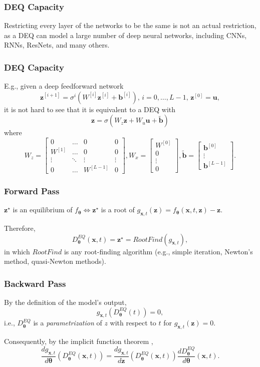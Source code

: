 \documentclass[t]{beamer}
\begin{document}
\begin{frame}
    \frametitle{DEQ Capacity}
    \vfill
    Restricting every layer of the networks to be the same is not an actual restriction, as a DEQ can model a large number of deep neural networks, including CNNs, RNNs, ResNets, and many others.
    \vfill
\end{frame}

\begin{frame}
    \frametitle{DEQ Capacity}

    E.g., given a deep feedforward network \[
	\bm{z}^{[i+1]} = \sigma^{i}\left( W^{[i]}\bm{z}^{[i]} + \bm{b}^{[i]} \right),\,i=0,\ldots,L-1,\,\bm{z}^{[0]} = \bm{u}
    ,\]
    it is not hard to see that it is equivalent to a DEQ with \[
	\bm{z} = \sigma\left( W_z\bm{z} + W_u\bm{u} + \bm{\tilde{b}} \right) 
    \] where \[
    W_z=\begin{bmatrix} 
	0 & \hdots & 0 & 0 \\
	W^{[1]} & \hdots & 0 & 0 \\
	\vdots & \ddots & \vdots & \vdots \\
	0 & \hdots & W^{[L-1]} & 0
    \end{bmatrix},
    W_x = \begin{bmatrix} W^{[0]} \\ 0 \\ \vdots \\ 0 \end{bmatrix} ,
    \bm{\tilde{b}} = \begin{bmatrix} \bm{b}^{[0]} \\ \vdots \\ \bm{b}^{[L-1]} \end{bmatrix}
    .\] 
\end{frame}

\begin{frame}
    \frametitle{Forward Pass}
    $\bm{z}^{\star}$ is an equilibrium of $f_{\bm{\theta}} \iff \bm{z}^{\star}$ is a root of $g_{\bm{x},t}(\bm{z}) = f_{\bm{\theta}}(\bm{x},t,\bm{z}) - \bm{z}$.
    \linebreak

    Therefore, \[
	D^{EQ}_{\bm{\theta}}(\bm{x},t) = \bm{z}^{\star} = RootFind(g_{\bm{x},t})
    ,\] in which $RootFind$ is any root-finding algorithm (e.g., simple iteration, Newton's method, quasi-Newton methods).
\end{frame}

\begin{frame}
    \frametitle{Backward Pass}
    By the definition of the model's output, \[
	g_{\bm{x},t}(D^{EQ}_{\bm{\theta}}(t)) = 0
    ,\] i.e., $D^{EQ}_{\bm{\theta}}$ is a \emph{parametrization} of $z$ with respect to $t$ for $g_{\bm{x},t}(\bm{z})=0$.
    \linebreak

    Consequently, by the implicit function theorem \cite{Bai2019}, \[
	\frac{d g_{\bm{x},t}}{d \bm{\theta}}(D^{EQ}_{\bm{\theta}}(\bm{x},t)) = \frac{d g_{\bm{x},t}}{d \bm{z}}(D^{EQ}_{\bm{\theta}}(\bm{x},t)) \frac{d D^{EQ}_{\bm{\theta}}}{d \bm{\theta}}(\bm{x},t)
    .\] 
\end{frame}
\end{document}
